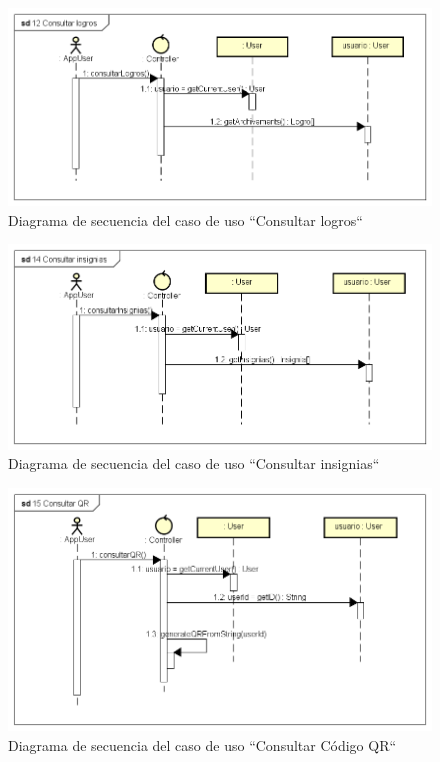 \documentclass[twoside]{report}
\begin{document}
\begin{figure}[H]
\includegraphics[scale=0.5]{images/sequence/checkArchivements}
\caption{Diagrama de secuencia del caso de uso “Consultar logros“}
\end{figure}

\begin{figure}[H]
\includegraphics[scale=0.5]{images/sequence/checkInsignias}
\caption{Diagrama de secuencia del caso de uso “Consultar insignias“}
\end{figure}

\begin{figure}[H]
\includegraphics[scale=0.5]{images/sequence/checkQR}
\caption{Diagrama de secuencia del caso de uso “Consultar Código QR“}
\end{figure}
\end{document}
